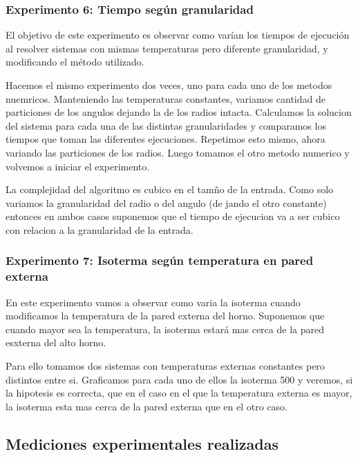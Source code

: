   	\subsubsection*{Experimento 6: Tiempo según granularidad}
  	El objetivo de este experimento es observar como varían los tiempos de ejecución al resolver sistemas con mismas temperaturas pero diferente granularidad, y modificando el método utilizado.
  	
    Hacemos el mismo experimento dos veces, uno para cada uno de los metodos nuemricos. Manteniendo las temperaturas constantes, variamos cantidad de particiones de los angulos dejando la de los radios intacta. Calculamos la solucion del sistema para cada una de las distintas granularidades y comparamos los tiempos que toman las diferentes ejecuciones. Repetimos esto mismo, ahora variando las particiones de los radios. Luego tomamos el otro metodo numerico y volvemos a iniciar el experimento. 

  	La complejidad del algoritmo es cubico en el tamño de la entrada. Como solo variamos la granularidad del radio o del angulo (de jando el otro constante) entonces en ambos casos suponemos que el tiempo de ejecucion va a ser cubico con relacion a la granularidad de la entrada.


    \subsubsection*{Experimento 7: Isoterma según temperatura en pared externa}
    En este experimento vamos a observar como varia la isoterma cuando modificamos la temperatura de la pared externa del horno.
    Suponemos que cuando mayor sea la temperatura, la isoterma estará mas cerca de la pared esxterna del alto horno. 

    Para ello tomamos dos sistemas con temperaturas externas constantes pero distintos entre si. Graficamos para cada uno de ellos la isoterma 500 y veremos, si la hipotesis es correcta, que en el caso en el que la temperatura externa es mayor, la isoterma esta mas cerca de la pared externa que en el otro caso. 

  \subsection{Mediciones experimentales realizadas}
